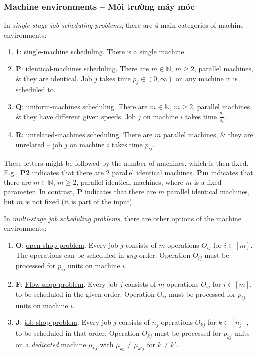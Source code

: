 \documentclass{article}
\begin{document}
\subsubsection{Machine environments -- Môi trường máy móc}
In {\it single-stage job scheduling problems}, there are 4 main categories of machine environments:
\begin{enumerate}
	\item {\bf1}: \href{https://en.wikipedia.org/wiki/Single-machine_scheduling}{single-machine scheduling}. There is a single machine.
	\item {\bf P}: \href{https://en.wikipedia.org/wiki/Identical-machines_scheduling}{identical-machines scheduling}. There are $m\in\mathbb{N}$, $m\ge2$, parallel machines, \& they are identical. Job $j$ takes time $p_j\in(0,\infty)$ on any machine it is scheduled to.
	\item {\bf Q}: \href{https://en.wikipedia.org/wiki/Uniform-machines_scheduling}{uniform-machines scheduling}. There are $m\in\mathbb{N}$, $m\ge2$, parallel machines, \& they have different given speeds. Job $j$ on machine $i$ takes time $\frac{p_j}{s_i}$.
	\item {\bf R}: \href{https://en.wikipedia.org/wiki/Unrelated-machines_scheduling}{unrelated-machines scheduling}. There are $m$ parallel machines, \& they are unrelated -- job $j$ on machine $i$ takes time $p_{ij}$.
\end{enumerate}
These letters might be followed by the number of machines, which is then fixed. E.g., {\bf P2} indicates that there are 2 parallel identical machines. {\bf Pm} indicates that there are $m\in\mathbb{N}$, $m\ge2$, parallel identical machines, where $m$ is a fixed parameter. In contrast, {\bf P} indicates that there are $m$ parallel identical machines, but $m$ is not fixed (it is part of the input).

In {\it multi-stage job scheduling problems}, there are other options of the machine environments:
\begin{enumerate}
	\item {\bf O}: \href{https://en.wikipedia.org/wiki/Open-shop_scheduling}{open-shop problem}. Every job $j$ consists of $m$ operations $O_{ij}$ for $i\in[m]$. The operations can be scheduled in {\it any} order. Operation $O_{ij}$ must be processed for $p_{ij}$ units on machine $i$.
	\item {\bf F}: \href{https://en.wikipedia.org/wiki/Flow-shop_scheduling}{Flow-shop problem}. Every job $j$ consists of $m$ operations $O_{ij}$ for $i\in[m]$, to be scheduled in the given order. Operation $O_{ij}$ must be processed for $p_{ij}$ units on machine $i$.
	\item {\bf J}: \href{https://en.wikipedia.org/wiki/Job-shop_scheduling}{job-shop problem}. Every job $j$ consists of $n_j$ operations $O_{kj}$ for $k\in[n_j]$, to be scheduled in that order. Operation $O_{kj}$ must be processed for $p_{kj}$ units on a {\it dedicated} machine $\mu_{kj}$ with $\mu_{kj}\ne\mu_{k'j}$ for $k\ne k'$.
\end{enumerate}
\end{document}
